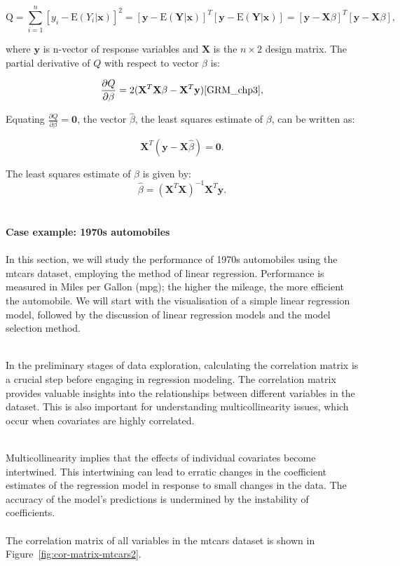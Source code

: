 \documentclass{article}\usepackage[]{graphicx}\usepackage[]{xcolor}
\begin{document}
\begin{equation*}
\mathrm{Q} = \sum_{i=1}^{n} [y_i - \mathrm{E} (Y_i | \mathbf{x})]^2 
           = [\mathbf{y}- \mathrm{E} (\mathbf{Y} | \mathbf{x})]^{T} [\mathbf{y}- \mathrm{E} (\mathbf{Y} | \mathbf{x})] 
           = [\mathbf{y}- \mathbf{X} \beta]^{T} [\mathbf{y}- \mathbf{X} \beta],
\end{equation*}

\noindent
where $\mathbf{y}$ is n-vector of response variables and $\mathbf{X}$ is the $n \times 2$ design matrix. The partial derivative of $Q$ with respect to vector $\beta$ is:

$$\frac{\partial Q}{\partial \beta} = 2(\mathbf{X}^T\mathbf{X}\beta - \mathbf{X}^T\mathbf{y})\cite{GRM_chp3},$$

\noindent
Equating $\frac{\partial Q}{\partial \beta} = \mathbf{0}$, the vector $\hat{\beta}$, the least squares estimate of $\beta$, can be written as:

$$\mathbf{X}^T(\mathbf{y}-\mathbf{X}\hat{\beta})=\mathbf{0}.$$

\noindent 
The least squares estimate of $\beta$ is given by:
$$\hat{\beta} = (\mathbf{X}^T\mathbf{X})^{-1}\mathbf{X}^T\mathbf{y}.$$
\\  
\noident 
\\\textbf{Case example: 1970s automobiles}\\
\noindent
\\In this section, we will study the performance of 1970s automobiles using the mtcars dataset, employing the method of linear regression. Performance is measured in Miles per Gallon (mpg); the higher the mileage, the more efficient the automobile. We will start with the visualisation of a simple linear regression model, followed by the discussion of linear regression models and the model selection method.

\noindent
\\In the preliminary stages of data exploration, calculating the correlation matrix is a crucial step before engaging in regression modeling. The correlation matrix provides valuable insights into the relationships between different variables in the dataset. This is also important for understanding multicollinearity issues, which occur when covariates are highly correlated.

\noindent
\\Multicollinearity implies that the effects of individual covariates become intertwined. This intertwining can lead to erratic changes in the coefficient estimates of the regression model in response to small changes in the data. The accuracy of the model’s predictions is undermined by the instability of coefficients\cite{multicoli}.\\
\noindent
\\The correlation matrix of all variables in the mtcars dataset is shown in Figure~\ref{fig:cor-matrix-mtcars2}.
\end{document}
